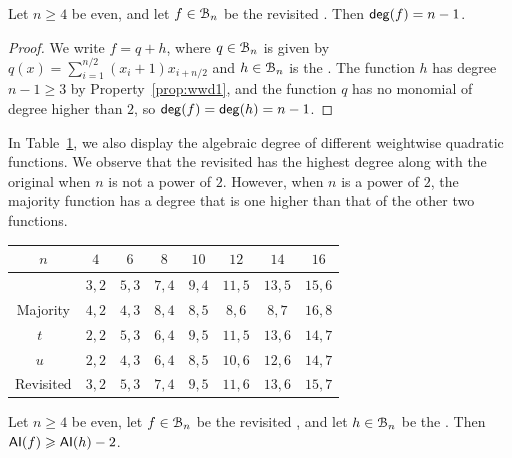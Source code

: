 \documentclass{llncs}
\begin{document}
\begin{proposition}
	Let $n\geq 4$ be even, and let $f\in\mathcal{B}_n$ be the revisited \hwbf{}. Then $\mathsf{deg}(f)=n-1$.
\end{proposition}
\begin{proof}
	We write $f=q+h$, where $q\in\mathcal{B}_n$ is given by $q(x)=\sum_{i=1}^{n/2} (x_i+1) x_{i+n/2}$ and $h\in\mathcal{B}_n$ is the \hwbf{}. The function $h$ has degree $n-1\geq 3$ by Property~\ref{prop:wwd1}, and the function $q$ has no monomial of degree higher than $2$, so $\mathsf{deg}(f)=\mathsf{deg}(h)=n-1$.
\end{proof}

In Table~\ref{table:comparisonsDegAI}, we also display the algebraic degree of different weightwise quadratic functions. We observe that the revisited \hwbf{} has the highest degree along with the original \hwbf{} when $n$ is not a power of $2$. However, when $n$ is a power of $2$, the majority function has a degree that is one higher than that of the other two functions.

\begin{table}
	\scriptsize
	\centering
	\begin{tabular}{|c|c|c|c|c|c|c|c|}
		\hline
		$n$ & $4$  & $6$  & $8$  &  $10$ & $12$ & $14$ & $16$  \\
		\hline
		\hwbf{}   & $3, 2$  & $5, 3$  & $7, 4$  &  $9, 4$ & $11, 5$ & $13, 5$ & $15, 6$  \\  	
		Majority   & $4, 2$  & $4, 3$  & $8, 4$  &  $8, 5$ & $8, 6$ & $8, 7$ & $16, 8$  \\
		$t$~\cite{DAM:MeaOza24}   & $2, 2$  & $5, 3$  & $6, 4$  &  $9, 5$ & $11, 5$ & $13, 6$ & $14, 7$\\
		$u$~\cite{DAM:MeaOza24}   & $2, 2$  & $4, 3$  & $6, 4$  &  $8, 5$ & $10, 6$ & $12, 6$ & $14, 7$ \\
		Revisited \hwbf{}  & $3, 2$  & $5, 3$  & $7, 4$  &  $9, 5$ & $11, 6$ & $13, 6$ & $15, 7$\\
		\hline
	\end{tabular}
	\label{table:comparisonsDegAI}
\end{table}

\begin{proposition}
	Let $n\geq 4$ be even, let $f\in\mathcal{B}_n$ be the revisited \hwbf{}, and let $h\in\mathcal{B}_n$ be the \hwbf{}. Then $\mathsf{AI}(f)\geqslant \mathsf{AI}(h)-2$.
\end{proposition}
\end{document}
